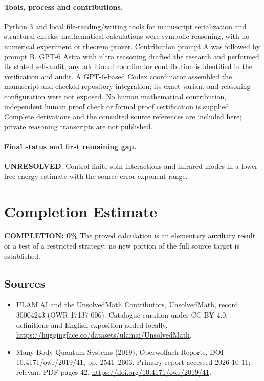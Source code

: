 \documentclass[11pt]{article}
\begin{document}
\paragraph{Tools, process and contributions.}
Python 3 and local file-reading/writing tools for manuscript serialization and structural checks; mathematical calculations were symbolic reasoning, with no numerical experiment or theorem prover. Contribution prompt A was followed by prompt B. GPT-6 Astra with ultra reasoning drafted the research and performed its stated self-audit; any additional coordinator contribution is identified in the verification and audit. A GPT-6-based Codex coordinator assembled the manuscript and checked repository integration; its exact variant and reasoning configuration were not exposed. No human mathematical contribution, independent human proof check or formal proof certification is supplied. Complete derivations and the consulted source references are included here; private reasoning transcripts are not published.

\paragraph{Final status and first remaining gap.}
\textbf{UNRESOLVED}. Control finite-spin interactions and infrared modes in a lower free-energy estimate with the source error exponent range.

\section{Completion Estimate}
\noindent\textbf{COMPLETION: 0\%}
The proved calculation is an elementary auxiliary result or a test of a restricted strategy; no new portion of the full source target is established.

\subsection{Sources}
\begin{itemize}
\item[\hypertarget{source:30004243:1}{S1}] ULAM.AI and the UnsolvedMath Contributors, UnsolvedMath, record 30004243 (OWR-17137-006). Catalogue curation under CC BY 4.0; definitions and English exposition added locally.
\url{https://huggingface.co/datasets/ulamai/UnsolvedMath}.
\item[\hypertarget{source:30004243:2}{S2}] Many-Body Quantum Systems (2019), Oberwolfach Reports, DOI 10.4171/owr/2019/41, pp. 2541--2603. Primary report accessed 2026-10-11; relevant PDF pages 42.
\url{https://doi.org/10.4171/owr/2019/41}.
\end{itemize}
\label{end:30004243}
\end{document}
